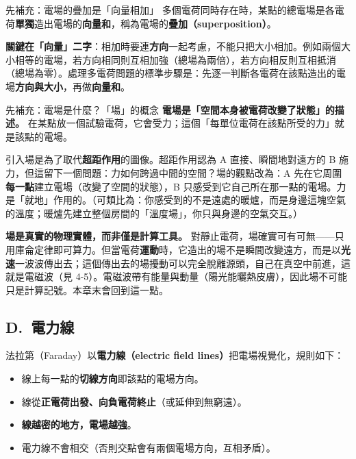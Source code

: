 \documentclass[11pt]{article}
\begin{document}
\begin{補充框}{先補充：電場的疊加是「向量相加」}
多個電荷同時存在時，某點的總電場是各電荷\textbf{單獨}造出電場的\textbf{向量和}，稱為電場的\textbf{疊加（superposition）}。

\textbf{關鍵在「向量」二字}：相加時要連\textbf{方向}一起考慮，不能只把大小相加。例如兩個大小相等的電場，若方向相同則互相加強（總場為兩倍），若方向相反則互相抵消（總場為零）。處理多電荷問題的標準步驟是：先逐一判斷各電荷在該點造出的電場\textbf{方向與大小}，再做\textbf{向量和}。
\end{補充框}

\begin{補充框}{先補充：電場是什麼？「場」的概念}
\textbf{電場是「空間本身被電荷改變了狀態」的描述。} 在某點放一個試驗電荷，它會受力；這個「每單位電荷在該點所受的力」就是該點的電場。

引入場是為了取代\textbf{超距作用}的圖像。超距作用認為 A 直接、瞬間地對遠方的 B 施力，但這留下一個問題：力如何跨過中間的空間？場的觀點改為：A 先在它周圍\textbf{每一點}建立電場（改變了空間的狀態），B 只感受到它自己所在那一點的電場。力是「就地」作用的。（可類比為：你感受到的不是遠處的暖爐，而是身邊這塊空氣的溫度；暖爐先建立整個房間的「溫度場」，你只與身邊的空氣交互。）

\textbf{場是真實的物理實體，而非僅是計算工具。} 對靜止電荷，場確實可有可無——只用庫侖定律即可算力。但當電荷\textbf{運動}時，它造出的場不是瞬間改變遠方，而是以\textbf{光速}一波波傳出去；這個傳出去的場擾動可以完全脫離源頭，自己在真空中前進，這就是電磁波（見 4-5）。電磁波帶有能量與動量（陽光能曬熱皮膚），因此場不可能只是計算記號。本章末會回到這一點。
\end{補充框}

\subsection*{\sffamily D.\ 電力線}

法拉第（Faraday）以\textbf{電力線（electric field lines）}把電場視覺化，規則如下：

\begin{itemize}\setlength{\itemsep}{1pt}
\item 線上每一點的\textbf{切線方向}即該點的電場方向。
\item 線從\textbf{正電荷出發、向負電荷終止}（或延伸到無窮遠）。
\item \textbf{線越密的地方，電場越強}。
\item 電力線不會相交（否則交點會有兩個電場方向，互相矛盾）。
\end{itemize}
\end{document}
